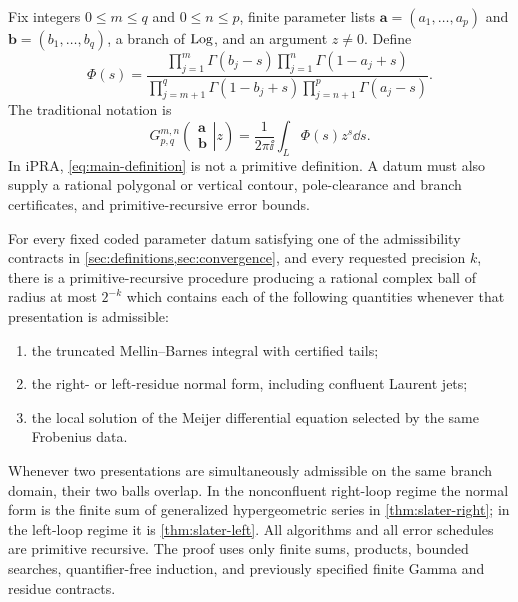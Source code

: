 Fix integers $0\le m\le q$ and $0\le n\le p$, finite parameter lists
$\mathbf a=(a_1,\ldots,a_p)$ and $\mathbf b=(b_1,\ldots,b_q)$, a branch of
$\operatorname{Log}$, and an argument $z\ne0$.  Define
\begin{equation}\label{eq:phi-minus}
 \Phi(s)=
 \frac{\prod_{j=1}^{m}\Gamma(b_j-s)
       \prod_{j=1}^{n}\Gamma(1-a_j+s)}
      {\prod_{j=m+1}^{q}\Gamma(1-b_j+s)
       \prod_{j=n+1}^{p}\Gamma(a_j-s)}.
\end{equation}
The traditional notation is
\begin{equation}\label{eq:main-definition}
 G_{p,q}^{m,n}\!\left(\left.\begin{matrix}\mathbf a\\\mathbf b\end{matrix}\right|z\right)
 =\frac1{2\pi\ii}\int_L \Phi(s)z^s\dd s.
\end{equation}
In iPRA, \eqref{eq:main-definition} is not a primitive definition.  A datum
must also supply a rational polygonal or vertical contour, pole-clearance and
branch certificates, and primitive-recursive error bounds.

\begin{theorem}\label{thm:master}
For every fixed coded parameter datum satisfying one of the admissibility
contracts in \cref{sec:definitions,sec:convergence}, and every requested
precision $k$, there is a primitive-recursive procedure producing a rational
complex ball of radius at most $2^{-k}$ which contains each of the following
quantities whenever that presentation is admissible:
\begin{enumerate}[label=(\roman*)]
\item the truncated Mellin--Barnes integral with certified tails;
\item the right- or left-residue normal form, including confluent Laurent jets;
\item the local solution of the Meijer differential equation selected by the
      same Frobenius data.
\end{enumerate}
Whenever two presentations are simultaneously admissible on the same branch
domain, their two balls overlap.  In the nonconfluent right-loop regime the
normal form is the finite sum of generalized hypergeometric series in
\cref{thm:slater-right}; in the left-loop regime it is
\cref{thm:slater-left}.  All algorithms and all error schedules are primitive
recursive.  The proof uses only finite sums, products, bounded searches,
quantifier-free induction, and previously specified finite Gamma and residue
contracts.
\end{theorem}

